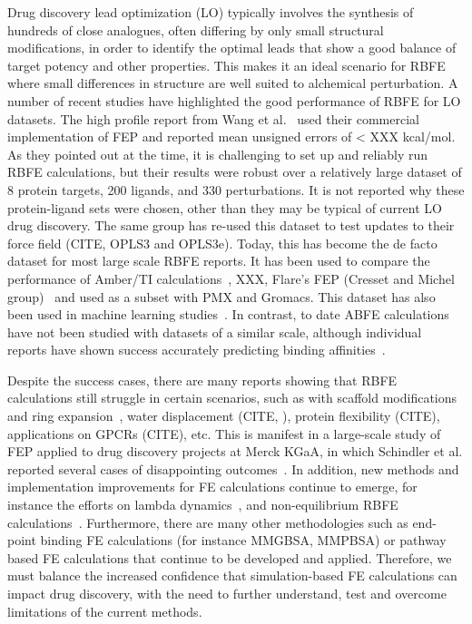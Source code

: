 \documentclass[9pt,bestpractices]{livecoms}
\begin{document}
Drug discovery lead optimization (LO) typically involves the synthesis of hundreds of close analogues, often differing by only small structural modifications, in order to identify the optimal leads that show a good balance of target potency and other properties. This makes it an ideal scenario for RBFE where small differences in structure are well suited to alchemical perturbation. A number of recent studies have highlighted the good performance of RBFE for LO datasets. The high profile report from Wang et al.~\cite{wangAccurateReliablePrediction2015} used their commercial implementation of FEP and reported mean unsigned errors of < XXX kcal/mol. As they pointed out at the time, it is challenging to set up and reliably run RBFE calculations, but their results were robust over a relatively large dataset of 8 protein targets, 200 ligands, and 330 perturbations. It is not reported why these protein-ligand sets were chosen, other than they may be typical of current LO drug discovery. The same group has re-used this dataset to test updates to their force field (CITE, OPLS3 and OPLS3e). Today, this has become the de facto dataset for most large scale RBFE reports. It has been used to compare the performance of Amber/TI calculations~\cite{songUsingAMBER18Relative2019}, XXX, Flare’s FEP (Cresset and Michel group)~\cite{kuhnAssessmentBindingAffinity2020} and used as a subset with PMX and Gromacs\cite{gapsysLargeScaleRelative2020}. This dataset has also been used in machine learning studies~\cite{jimenezDEEPProteinLigand2018,jimenez-lunaDeltaDeltaNeuralNetworks2019}. In contrast, to date ABFE calculations have not been studied with datasets of a similar scale, although individual reports have shown success accurately predicting binding affinities~\cite{aldeghiLargescaleAnalysisWater2018,courniaRigorousFreeEnergy2020}.

Despite the success cases, there are many reports showing that RBFE calculations still struggle in certain scenarios, such as with scaffold modifications~\cite{wangAccurateModelingScaffold2017} and ring expansion~\cite{liuRingBreakingFeasible2015}, water displacement (CITE, ), protein flexibility (CITE), applications on GPCRs (CITE), etc. This is manifest in a large-scale study of FEP applied to drug discovery projects at Merck KGaA, in which Schindler et al. reported several cases of disappointing outcomes~\cite{schindlerLargeScaleAssessmentBinding2020}. In addition, new methods and implementation improvements for FE calculations continue to emerge, for instance the efforts on lambda dynamics~\cite{knightMultisiteDynamicsSimulated2011,vilseckPredictingBindingFree2018}, and non-equilibrium RBFE calculations~\cite{gapsysLargeScaleRelative2020,rufaChemicalAccuracyAlchemical2020}. Furthermore, there are many other methodologies such as end-point binding FE calculations (for instance MMGBSA, MMPBSA) or pathway based FE calculations that continue to be developed and applied. Therefore, we must balance the increased confidence that simulation-based FE calculations can impact drug discovery, with the need to further understand, test and overcome limitations of the current methods. 
\end{document}
